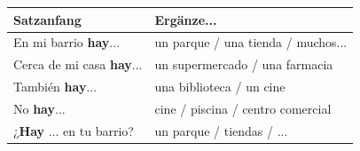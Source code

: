 \documentclass[11pt, a4paper]{article}
\begin{document}

\begin{center}
\end{center}

\vspace{0.3cm}


\begin{tcolorbox}[
    colback=gruppeA!10,
    colframe=gruppeA,
    title={\color{white}\bfseries HAY -- Es gibt... (Existenz)},
    fonttitle=\bfseries
]

\renewcommand{\arraystretch}{1.5}
\begin{tabular}{@{}p{9cm}p{7.5cm}@{}}
\textbf{Satzanfang} & \textbf{Ergänze...} \\
\hline
En mi barrio \textbf{hay}... & un parque / una tienda / muchos... \\
Cerca de mi casa \textbf{hay}... & un supermercado / una farmacia \\
También \textbf{hay}... & una biblioteca / un cine \\
No \textbf{hay}... & cine / piscina / centro comercial \\
¿\textbf{Hay} ... en tu barrio? & un parque / tiendas / ... \\
\end{tabular}

\end{tcolorbox}

\vspace{0.3cm}

\end{document}
